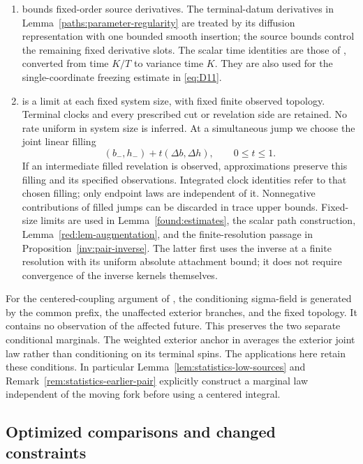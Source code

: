 \begin{enumerate}
\item \cite[Corollary~2.10]{PE} bounds fixed-order source derivatives.
The terminal-datum derivatives in Lemma~\ref{paths:parameter-regularity} are treated
by its diffusion representation with one bounded smooth insertion;
the source bounds control the remaining fixed derivative slots.
The scalar time identities are those of \cite[Lemma~5.3]{PE}, converted
from time $K/T$ to variance time $K$. They are also used for the
single-coordinate freezing estimate in \eqref{eq:D11}.

\item \cite[Proposition~2.14]{PE} is a limit at each fixed system size,
with fixed finite observed topology. Terminal clocks and every prescribed
cut or revelation side are retained. No rate uniform in system size is
inferred. At a simultaneous jump we choose the joint linear filling
\[
 (b_-,h_-)+t(\Delta b,\Delta h),\qquad 0\le t\le1.
\]
If an intermediate filled revelation is observed, approximations preserve
this filling and its specified observations. Integrated clock identities
refer to that chosen filling; only endpoint laws are independent of it.
Nonnegative contributions of filled jumps can be discarded in trace
upper bounds. Fixed-size limits are used in Lemma~\ref{found:estimates},
the scalar path construction, Lemma~\ref{red:lem-augmentation}, and the
finite-resolution passage in Proposition~\ref{inv:pair-inverse}.
The latter first uses the inverse at a finite resolution with its
uniform absolute attachment bound; it does not require convergence of
the inverse kernels themselves.
\end{enumerate}

For the centered-coupling argument of \cite[Lemmas~2.11--2.13 and~4.5]{PE},
the conditioning sigma-field is generated by the common prefix, the
unaffected exterior branches, and the fixed topology. It contains no
observation of the affected future. This preserves the two separate
conditional marginals. The weighted exterior anchor in
\cite[Lemma~4.8]{PE} averages the exterior joint law rather than
conditioning on its terminal spins. The applications here retain these
conditions. In particular Lemma~\ref{lem:statistics-low-sources} and
Remark~\ref{rem:statistics-earlier-pair} explicitly construct a marginal
law independent of the moving fork before using a centered integral.

\subsection{Optimized comparisons and changed constraints}

